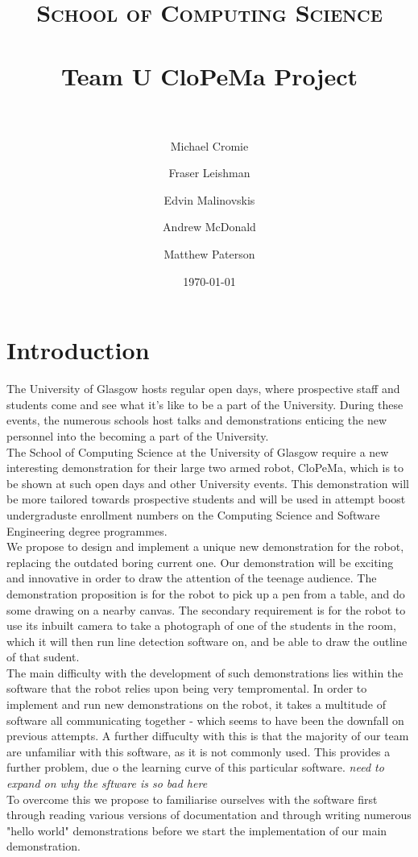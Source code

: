 \documentclass[paper=a4, fontsize=11pt]{scrartcl}
\title{
		\usefont{OT1}{bch}{b}{n}
		\normalfont \normalsize \textsc{School of Computing Science} \\ [25pt]
		\horrule{0.5pt} \\[0.4cm]
		\huge Team U CloPeMa Project \\
		\horrule{2pt} \\[0.5cm]
		}
\author{
	\usefont{OT1}{bch}{b}{n}
    	\normalfont Michael Cromie\\
    	\and
    	Fraser Leishman\\
    	\and
    	Edvin Malinovskis\\
    	\and
    	Andrew McDonald\\
    	\and
    	Matthew Paterson
	}
\date{
		\usefont{OT1}{bch}{b}{n}
		\normalfont \normalsize \today
        }
\numberwithin{equation}{section}		%
\numberwithin{figure}{section}			%
\numberwithin{table}{section}				%
\begin{document}
\maketitle


\abstract {}



\section{Introduction}

The University of Glasgow hosts regular open days, where prospective staff and students come and see what it's like to be a part of the University. During these events, the numerous schools host talks and demonstrations enticing the new personnel into the becoming a part of the University. \\
The School of Computing Science at the University of Glasgow require a new interesting demonstration for their large two armed robot, CloPeMa, which is to be shown at such open days and other University events. This demonstration will be more tailored towards prospective students and will be used in attempt boost undergraduste enrollment numbers on the Computing Science and Software Engineering degree programmes.\\
We propose to design and implement a unique new demonstration for the robot, replacing the outdated boring current one. Our demonstration will be exciting and innovative in order to draw the attention of the teenage audience. The demonstration proposition is for the robot to pick up a pen from a table, and do some drawing on a nearby canvas. The secondary requirement is for the robot to use its inbuilt camera to take a photograph of one of the students in the room, which it will then run line detection software on, and be able to draw the outline of that sudent.\\
The main difficulty with the development of such demonstrations lies within the software that the robot relies upon being very tempromental. In order to implement and run new demonstrations on the robot, it takes a multitude of software all communicating together - which seems to have been the downfall on previous attempts. A further diffuculty with this is that the majority of our team are unfamiliar with this software, as it is not commonly used. This provides a further problem, due o the learning curve of this particular software. \textit{need to expand on why the sftware is so bad here} \\
To overcome this we propose to familiarise ourselves with the software first through reading various versions of documentation and through writing numerous "hello world" demonstrations before we start the implementation of our main demonstration.\\









\end{document}
